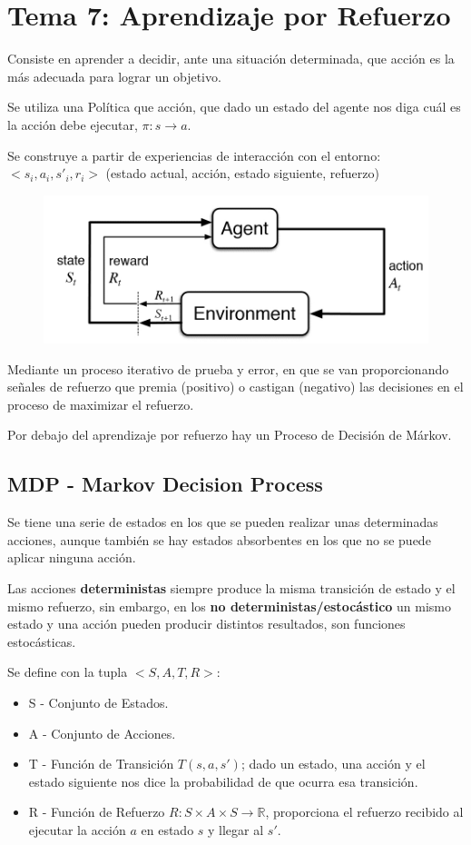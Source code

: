 \documentclass[12pt, twoside, openright]{report} %
\begin{document}
\chapter{Tema 7: Aprendizaje por Refuerzo}
Consiste en aprender a decidir, ante una situación determinada, que acción es la más adecuada para lograr un objetivo.

Se utiliza una Política que acción, que dado un estado del agente nos diga cuál es la acción debe ejecutar, $\pi: s \rightarrow a$.

Se construye a partir de experiencias de interacción con el entorno: $<s_i, a_i, s'_i, r_i>$ (estado actual, acción, estado siguiente, refuerzo)
\begin{figure}[H]
	{\includegraphics[scale=.3]{default.jpg}}
\end{figure}

Mediante un proceso iterativo de prueba y error, en que se van proporcionando señales de refuerzo que premia (positivo) o castigan (negativo) las decisiones en el proceso de maximizar el refuerzo.

Por debajo del aprendizaje por refuerzo hay un Proceso de Decisión de Márkov.

\section{MDP - Markov Decision Process}

Se tiene una serie de estados en los que se pueden realizar unas determinadas acciones, aunque también se hay estados absorbentes en los que no se puede aplicar ninguna acción.

Las acciones \textbf{deterministas} siempre produce la misma transición de estado y el mismo refuerzo, sin embargo, en los \textbf{no deterministas/estocástico} un mismo estado y una acción pueden producir distintos resultados, son funciones estocásticas.

Se define con la tupla $<S, A, T, R>$:
\begin{itemize}
	\item S - Conjunto de Estados.
	\item A - Conjunto de Acciones.
	\item T - Función de Transición $T(s, a, s')$; dado un estado, una acción y el estado siguiente nos dice la probabilidad de que ocurra esa transición.
	\item R - Función de Refuerzo $R: S \times A \times S \rightarrow \mathbb{R}$, proporciona el refuerzo recibido al ejecutar la acción $a$ en estado $s$ y llegar al $s'$.
\end{itemize}
\end{document}
